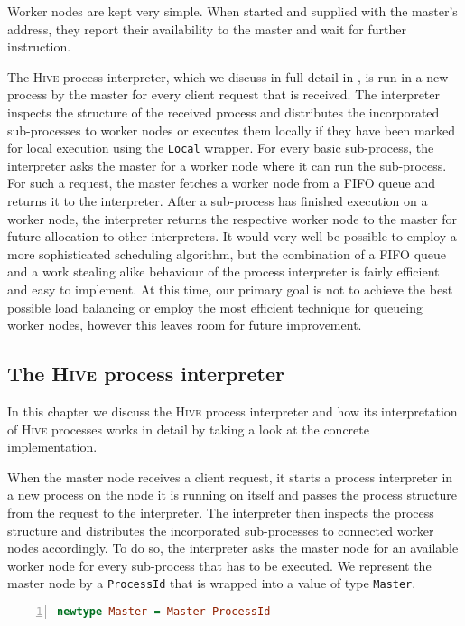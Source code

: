 Worker nodes are kept very simple. When started and supplied with the master's address, they report their availability to the master and wait for further instruction.

The \textsc{Hive} process interpreter, which we discuss in full detail in , is run in a new process by the master for every client request that is received. The interpreter inspects the structure of the received process and distributes the incorporated sub-processes to worker nodes or executes them locally if they have been marked for local execution using the \texttt{Local} wrapper. For every basic sub-process, the interpreter asks the master for a worker node where it can run the sub-process. For such a request, the master fetches a worker node from a FIFO queue and returns it to the interpreter. After a sub-process has finished execution on a worker node, the interpreter returns the respective worker node to the master for future allocation to other interpreters. It would very well be possible to employ a more sophisticated scheduling algorithm, but the combination of a FIFO queue and a work stealing \cite{} alike behaviour of the process interpreter is fairly efficient and easy to implement. At this time, our primary goal is not to achieve the best possible load balancing or employ the most efficient technique for queueing worker nodes, however this leaves room for future improvement.


\subsection{The \textsc{Hive} process interpreter}
\label{chp:interpreter}
In this chapter we discuss the \textsc{Hive} process interpreter and how its interpretation of \textsc{Hive} processes works in detail by taking a look at the concrete implementation.

When the master node receives a client request, it starts a process interpreter in a new process on the node it is running on itself and passes the process structure from the request to the interpreter. The interpreter then inspects the process structure and distributes the incorporated sub-processes to connected worker nodes accordingly. To do so, the interpreter asks the master node for an available worker node for every sub-process that has to be executed. We represent the master node by a \texttt{ProcessId} that is wrapped into a value of type \texttt{Master}.
\begin{lstlisting}[language=Haskell,caption=Data type for the address of a master node.,numbers=left,frame=bt]
newtype Master = Master ProcessId
\end{lstlisting}

